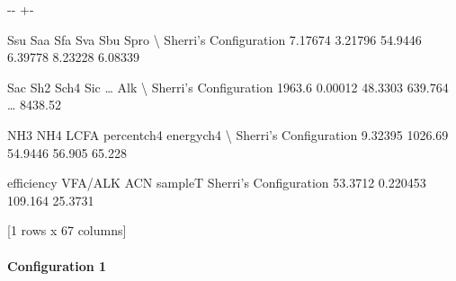 \documentclass[a4paper,10pt,english]{sphinxmanual}
\newlength\nbsphinxcodecellspacing
\begin{document}
{

\kern-\sphinxverbatimsmallskipamount\kern-\baselineskip
\kern+\FrameHeightAdjust\kern-\fboxrule
\vspace{\nbsphinxcodecellspacing}

\begin{sphinxVerbatim}[commandchars=\\\{\}]
\llap{\color{nbsphinxout}[10]:\,\hspace{\fboxrule}\hspace{\fboxsep}}                           Ssu      Saa      Sfa      Sva      Sbu     Spro   \textbackslash{}
Sherri's Configuration  7.17674  3.21796  54.9446  6.39778  8.23228  6.08339

                          Sac      Sh2     Sch4      Sic   {\ldots}     Alk   \textbackslash{}
Sherri's Configuration  1963.6  0.00012  48.3303  639.764  {\ldots}  8438.52

                           NH3      NH4     LCFA    percentch4    energych4   \textbackslash{}
Sherri's Configuration  9.32395  1026.69  54.9446        56.905       65.228

                        efficiency   VFA/ALK      ACN  sampleT
Sherri's Configuration     53.3712  0.220453  109.164  25.3731

[1 rows x 67 columns]
\end{sphinxVerbatim}
}


\paragraph{Configuration 1}
\label{\detokenize{jupyter_notebook/ADM1F_SRT_2phase:Configuration-1}}
{
\begin{sphinxVerbatim}[commandchars=\\\{\}]
\llap{\color{nbsphinxin}[11]:\,\hspace{\fboxrule}\hspace{\fboxsep}}
  
    \PYG{p}{[}\PYG{p}{]} \PYG{p}{[}\PYG{p}{]}
\end{sphinxVerbatim}
}
\end{document}
